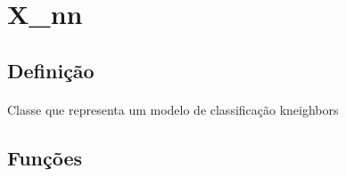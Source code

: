 \documentclass{article}
\begin{document}
\section{X\_nn} 

\subsection{Definição}

\paragraph{} Classe que representa um modelo de classificação kneighbors

\subsection{Funções}
\end{document}
